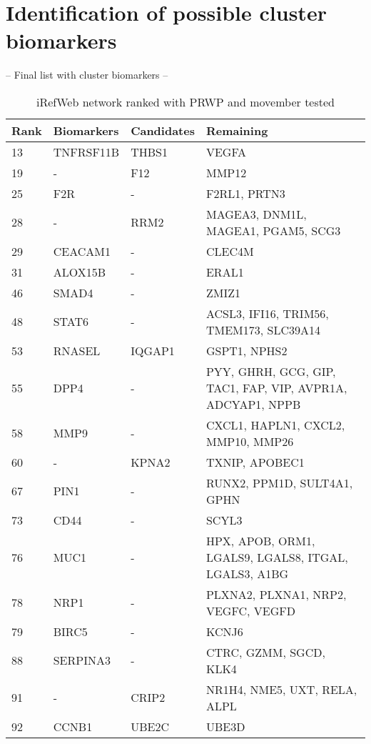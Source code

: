 \section{Identification of possible cluster biomarkers}
-- Final list with cluster biomarkers --
\begin{table}
    \begin{tabular}{|p{1cm}|p{3cm}|p{3cm}|p{4cm}|}
        \hline
        \textbf{Rank} & \textbf{Biomarkers} & \textbf{Candidates} & \textbf{Remaining} \\
        \hline
        13	& TNFRSF11B	& THBS1	& VEGFA \\
        \hline
        19	& -	& F12	& MMP12 \\
        \hline
        25	& F2R	& -	& F2RL1, PRTN3 \\
        \hline
        28	& -	& RRM2	& MAGEA3, DNM1L, MAGEA1, PGAM5, SCG3 \\
        \hline
        29	& CEACAM1	& -	& CLEC4M \\
        \hline
        31	& ALOX15B	& -	& ERAL1 \\
        \hline
        46	& SMAD4	& -	& ZMIZ1 \\
        \hline
        48	& STAT6	& -	& ACSL3, IFI16, TRIM56, TMEM173, SLC39A14 \\
        \hline
        53	& RNASEL	& IQGAP1	& GSPT1, NPHS2 \\
        \hline
        55	& DPP4	& -	& PYY, GHRH, GCG, GIP, TAC1, FAP, VIP, AVPR1A, ADCYAP1, NPPB \\
        \hline
        58	& MMP9	& -	& CXCL1, HAPLN1, CXCL2, MMP10, MMP26 \\
        \hline
        60	& -	& KPNA2	& TXNIP, APOBEC1 \\
        \hline
        67	& PIN1	& -	& RUNX2, PPM1D, SULT4A1, GPHN \\
        \hline
        73	& CD44	& -	& SCYL3 \\
        \hline
        76	& MUC1	& -	& HPX, APOB, ORM1, LGALS9, LGALS8, ITGAL, LGALS3, A1BG \\
        \hline
        78	& NRP1	& -	& PLXNA2, PLXNA1, NRP2, VEGFC, VEGFD \\
        \hline
        79	& BIRC5	& -	& KCNJ6 \\
        \hline
        88	& SERPINA3	& -	& CTRC, GZMM, SGCD, KLK4 \\
        \hline
        91	& -	& CRIP2	& NR1H4, NME5, UXT, RELA, ALPL \\
        \hline
        92	& CCNB1	& UBE2C	& UBE3D \\
        \hline
    \end{tabular}
    \caption{iRefWeb network ranked with PRWP and movember tested}
    \label{tab:prwp-movember}
\end{table}

